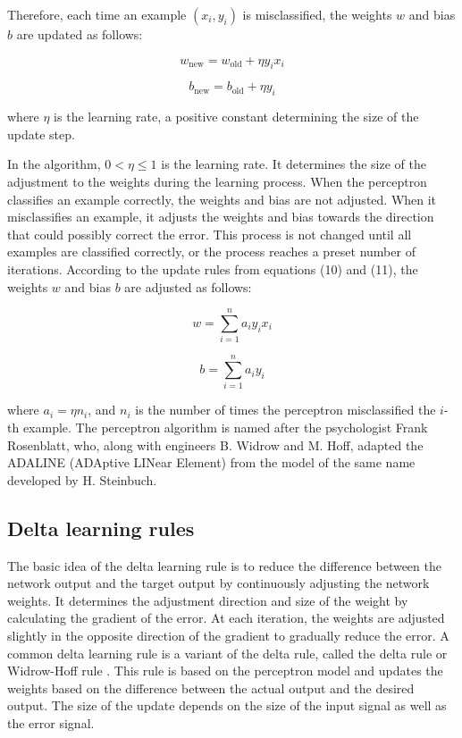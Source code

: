 \documentclass[paper=a4, fontsize=11pt]{scrartcl} %
\numberwithin{equation}{section} %
\numberwithin{figure}{section} %
\numberwithin{table}{section} %
\begin{document}
Therefore, each time an example \( (x_i, y_i) \) is misclassified, the weights \( w \) and bias \( b \) are updated as follows:

\begin{equation}
w_{\text{new}} = w_{\text{old}} + \eta y_i x_i
\end{equation}

\begin{equation}
b_{\text{new}} = b_{\text{old}} + \eta y_i
\end{equation}

where \( \eta \) is the learning rate, a positive constant determining the size of the update step.


In the algorithm, \( 0 < \eta \leq 1 \) is the learning rate. It determines the size of the adjustment to the weights during the learning process. When the perceptron classifies an example correctly, the weights and bias are not adjusted. When it misclassifies an example, it adjusts the weights and bias towards the direction that could possibly correct the error. This process is not changed until all examples are classified correctly, or the process reaches a preset number of iterations. According to the update rules from equations (10) and (11), the weights \( w \) and bias \( b \) are adjusted as follows:

\begin{equation}
w = \sum_{i=1}^{n} a_i y_i x_i
\end{equation}

\begin{equation}
b = \sum_{i=1}^{n} a_i y_i
\end{equation}

where \( a_i = \eta n_i \), and \( n_i \) is the number of times the perceptron misclassified the \( i \)-th example. The perceptron algorithm is named after the psychologist Frank Rosenblatt, who, along with engineers B. Widrow and M. Hoff, adapted the ADALINE (ADAptive LINear Element) from the model of the same name developed by H. Steinbuch.

\subsection{Delta learning rules}

The basic idea of the delta learning rule is to reduce the difference between the network output and the target output by continuously adjusting the network weights. It determines the adjustment direction and size of the weight by calculating the gradient of the error. At each iteration, the weights are adjusted slightly in the opposite direction of the gradient to gradually reduce the error.
A common delta learning rule is a variant of the delta rule, called the delta rule or Widrow-Hoff rule \cite{BernardWidrow1960AdaptiveSwitchingCircuits}. This rule is based on the perceptron model and updates the weights based on the difference between the actual output and the desired output. The size of the update depends on the size of the input signal as well as the error signal.
\end{document}
